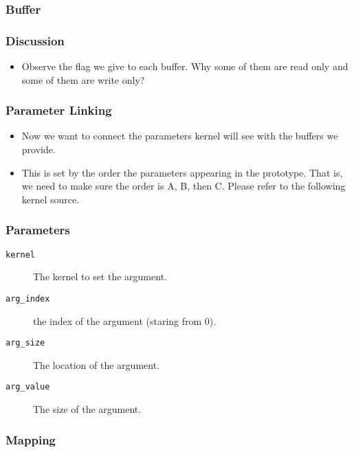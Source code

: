 \documentclass{beamer}
\begin{document}
\begin{frame}
  \frametitle{Buffer}
  \centerline{}
\end{frame}

\begin{frame}
  \frametitle{Discussion}
  \begin{itemize}
    \item Observe the flag we give to each buffer.  Why some of them
      are read only and some of them are write only?
  \end{itemize}
\end{frame}


\begin{frame}
  \frametitle{Parameter Linking}
  \begin{itemize}
  \item Now we want to connect the parameters kernel will see with the
    buffers we provide.
  \item This is set by the order the parameters appearing in the
    prototype.  That is, we need to make sure the order is A, B, then
    C.  Please refer to the following kernel source.
  \end{itemize}
\end{frame}

\begin{frame}
\end{frame}

\begin{frame}
\end{frame}

\begin{frame}
  \frametitle{Parameters}
  \begin{description}
  \item [\tt kernel] The kernel to set the argument.
  \item [\tt arg\_index] the index of the argument (staring from 0).
  \item [\tt arg\_size] The location of the argument.
  \item [\tt arg\_value] The size of the argument.
  \end{description}
\end{frame}

\begin{frame}
  \frametitle{Mapping}
\end{frame}
\end{document}
